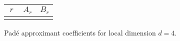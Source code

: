 \documentclass[11pt, oneside]{article}
\begin{document}
\newcommand{\dval}{4}    %
\newcommand{\ORDval}{34} %

\begin{center}
\renewcommand{\arraystretch}{1.2}
\begin{tabular}{|c|| c| c |} 
 \hline
  $\ r\ $ & $A_{r}$ & $B_{r}$  \\ [0.5ex] 
 \hline
%
\\[0.3ex]
 \hline
\end{tabular}

\bigskip

Pad\'e approximant coefficients for local dimension $d = \dval$.
\end{center}
\end{document}
